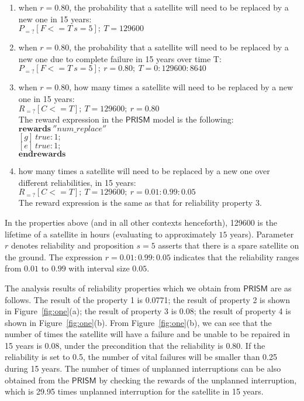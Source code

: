 \documentclass[preprint,12pt]{qrei}
\begin{document}
\begin{enumerate}
\item when $r=0.80$, the probability that a satellite will need to be replaced by a new one in 15 years:\\
$P_{=?}[F<=T\ s=5];\ T=129600$
\item when $r=0.80$, the probability that a satellite will need to be replaced by a new one due to complete failure in 15 years over time T:\\
$P_{=?}[F<=T\ s=5];\ r=0.80;\ T=0:129600:8640$
\item when $r=0.80$, how many times a satellite will need to be replaced by a new one in 15 years:\\
$R_{=?}[C<=T];\ T= 129600;\ r=0.80$\\
The reward expression in the $\mathsf{PRISM}$ model is the following:\\
$\textbf{rewards}\ ''num\_replace''$\\
$[g]\ true : 1;$\\
$[e]\ true : 1;$\\
$\textbf{endrewards}$
\item how many times a satellite will need to be replaced by a new one over different reliabilities, in 15 years:\\
$R_{=?} [ C<=T ];\ T= 129600;\ r=0.01:0.99:0.05$\\
The reward expression is the same as that for reliability property 3.
\end{enumerate}

In the properties above (and in all other contexts henceforth), 129600 is the lifetime of a satellite in hours (evaluating to approximately $15$ years). Parameter $r$ denotes reliability and proposition $s=5$ asserts that there is a spare satellite on the ground. 
The expression $ r=0.01:0.99:0.05$ indicates that the reliability ranges from $0.01$ to $0.99$ with interval size $0.05$. 

The analysis results of reliability properties which we obtain from $\mathsf{PRISM}$ are as follows. The result of the property 1 is 0.0771; the result of property 2 is shown in Figure~\ref{fig:one}(a); the result of property 3 is 0.08; the result of property 4 is shown in Figure~\ref{fig:one}(b). From Figure~\ref{fig:one}(b), we can see that the number of times the satellite will have a failure and be unable to be repaired in 15 years is 0.08, under the precondition that the reliability is 0.80. If the reliability is set to 0.5, the number of vital failures will be smaller than 0.25 during 15 years. The number of times of unplanned interruptions can be also obtained from the $\mathsf{PRISM}$ by checking the rewards of the unplanned interruption, which is 29.95 times unplanned interruption for the satellite in 15 years.
\end{document}
